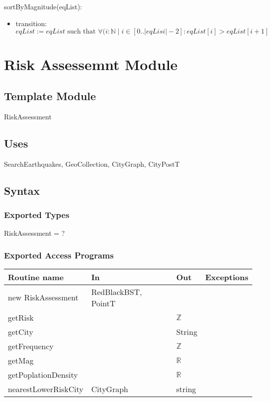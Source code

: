\documentclass[12pt]{article}
\begin{document}
\noindent sortByMagnitude(eqList):
\begin{itemize}
\item transition: $\mathit{eqList} := eqList  
\mbox{ such that } \forall (i : \mathbb{N} \;|\; i \in [0..|eqLisi| - 2] :eqList[i] > eqList[i + 1]$
\end{itemize}






\newpage

\section* {Risk Assessemnt Module}

\subsection* {Template Module}

RiskAssessment

\subsection* {Uses}

SearchEarthquakes, GeoCollection, CityGraph, CityPostT

\subsection* {Syntax}

\subsubsection* {Exported Types}

RiskAssessment = ?


\subsubsection* {Exported Access Programs}

\begin{tabular}{| l | l | l | p{6cm} |}
\hline
\textbf{Routine name} & \textbf{In} & \textbf{Out} & \textbf{Exceptions}\\
\hline
new RiskAssessment & RedBlackBST, PointT &  & \\
\hline
getRisk &  & $\mathbb{Z}$ & \\
\hline
getCity &  & String& \\
\hline
getFrequency &  & $\mathbb{Z}$ & \\
\hline
getMag &  & $\mathbb{R}$ & \\
\hline
getPoplationDensity &  & $\mathbb{R}$ & \\
\hline
nearestLowerRiskCity & CityGraph & string & \\
\hline
\end{tabular}
\end{document}
